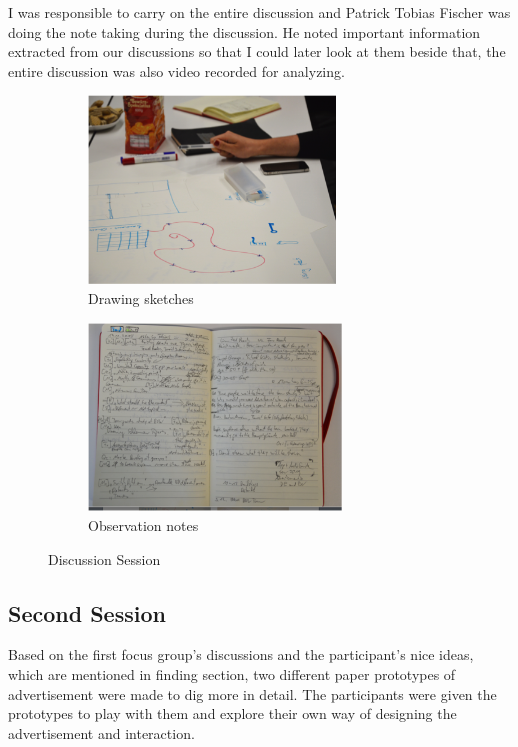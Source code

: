 I was responsible to carry on the entire discussion and Patrick Tobias Fischer was doing the note taking during the discussion. He noted important information extracted from our discussions so that I could later look at them beside that, the entire discussion was also video recorded for analyzing.



\begin{figure}[H]
    \centering
    \begin{subfigure}[H]{0.45\textwidth}
        \centering
        \includegraphics[width=\textwidth,height=5cm]{Figures/4/drawings}
        \caption{Drawing sketches}
        \label{fig:focus_group}
    \end{subfigure}
    \begin{subfigure}[H]{0.45\textwidth}
        \centering
        \includegraphics[width=\textwidth,height=5cm]{Figures/4/notes}
        \caption{Observation notes}
        \label{fig:meeting_room}
    \end{subfigure}
    \caption{Discussion Session}
    \label{fig:observation_env_observation_note}
\end{figure}


\subsection{Second Session}
Based on the first focus group's discussions and the participant's nice ideas, which are mentioned in finding section, two different paper prototypes of advertisement were made to dig more in detail. The participants were given the prototypes to play with them and explore their own way of designing the advertisement and interaction.

